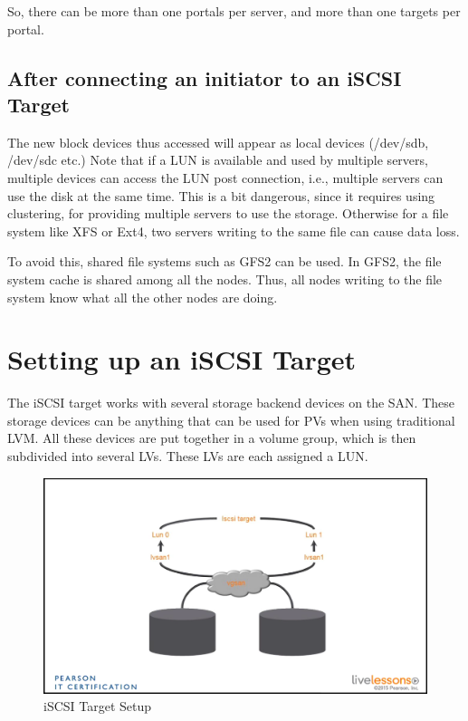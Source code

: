 \noindent
So, there can be more than one portals per server, and more than one targets per portal. 

\subsection{After connecting an initiator to an iSCSI Target}
The new block devices thus accessed will appear as local devices (/dev/sdb, /dev/sdc etc.) Note that if a LUN is available and used by multiple servers, multiple devices can access the LUN post connection, i.e., multiple servers can use the disk at the same time. This is a bit dangerous, since it requires using clustering, for providing multiple servers to use the storage. Otherwise for a file system like XFS or Ext4, two servers writing to the same file can cause data loss. 

To avoid this, shared file systems such as GFS2 can be used. In GFS2, the file system cache is shared among all the nodes. Thus, all nodes writing to the file system know what all the other nodes are doing. 

\section{Setting up an iSCSI Target}
The iSCSI target works with several storage backend devices on the SAN. These storage devices can be anything that can be used for PVs when using traditional LVM. All these devices are put together in a volume group, which is then subdivided into several LVs. These LVs are each assigned a LUN. 

\begin{figure}[H]
	\centering
	\includegraphics[width=0.9\linewidth]{Mod1/chapters/1.2.a}
	\caption{iSCSI Target Setup}
	\label{fig:1 iSCSI Target Setup}
\end{figure}

